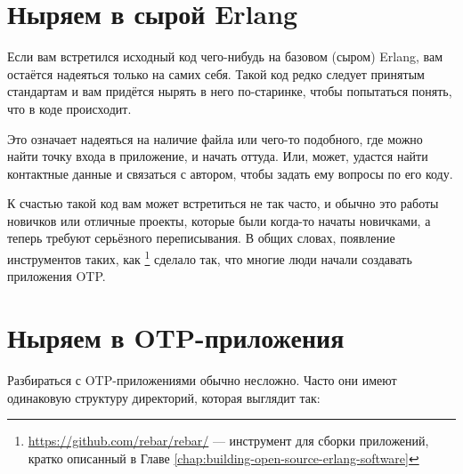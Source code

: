 \section{Ныряем в сырой Erlang}
\label{sec:dive-raw-erlang}

Если вам встретился исходный код чего-нибудь на базовом (сыром) Erlang, вам остаётся надеяться только на самих себя. Такой код редко следует принятым стандартам и вам придётся нырять в него по-старинке, чтобы попытаться понять, что в коде происходит.

Это означает надеяться на наличие файла  или чего-то подобного, где можно найти точку входа в приложение, и начать оттуда. Или, может, удастся найти контактные данные и связаться с автором, чтобы задать ему вопросы по его коду.

К счастью такой код вам может встретиться не так часто, и обычно это работы новичков или отличные проекты, которые были когда-то начаты новичками, а теперь требуют серьёзного переписывания. В общих словах, появление инструментов таких, как \footnote{\href{https://github.com/rebar/rebar/}{https://github.com/rebar/rebar/} — инструмент для сборки приложений, кратко описанный в Главе \ref{chap:building-open-source-erlang-software}} сделало так, что многие люди начали создавать приложения OTP.


\section{Ныряем в OTP-приложения}
\label{sec:dive-otp-applications}

Разбираться с OTP-приложениями обычно несложно. Часто они имеют одинаковую структуру директорий, которая выглядит так:

